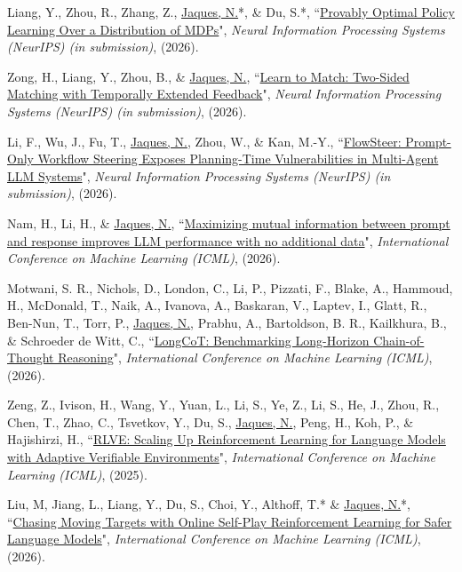\documentclass[paper=letter,fontsize=11pt]{scrartcl} %
\newcommand{\PaperEntry}[6]{
		\noindent #1, ``\href{#6}{#2}", \textit{#3}, #4 (#5).}
\begin{document}
\begin{etaremune}
\item \PaperEntry{Liang, Y., Zhou, R., Zhang, Z., \underline{Jaques, N.}*, \& Du, S.*}{Provably Optimal Policy Learning Over a Distribution of MDPs}{Neural Information Processing Systems (NeurIPS) (in submission)}{}{2026}{}

\item \PaperEntry{Zong, H., Liang, Y., Zhou, B., \& \underline{Jaques, N.}}{Learn to Match: Two-Sided Matching with Temporally Extended Feedback}{Neural Information Processing Systems (NeurIPS) (in submission)}{}{2026}{https://arxiv.org/abs/2606.06744}

\item \PaperEntry{Li, F., Wu, J., Fu, T., \underline{Jaques, N.}, Zhou, W., \& Kan, M.-Y.}{FlowSteer: Prompt-Only Workflow Steering Exposes Planning-Time Vulnerabilities in Multi-Agent LLM Systems}{Neural Information Processing Systems (NeurIPS) (in submission)}{}{2026}{https://arxiv.org/abs/2605.11514}

\item \PaperEntry{Nam, H., Li, H., \& \underline{Jaques, N.}}{Maximizing mutual information between prompt and response improves LLM performance with no additional data}{International Conference on Machine Learning (ICML)}{}{2026}{https://arxiv.org/abs/2603.19294}

\item \PaperEntry{Motwani, S. R., Nichols, D., London, C., Li, P., Pizzati, F., Blake, A., Hammoud, H., McDonald, T., Naik, A., Ivanova, A., Baskaran, V., Laptev, I., Glatt, R., Ben-Nun, T., Torr, P., \underline{Jaques, N.}, Prabhu, A., Bartoldson, B. R., Kailkhura, B., \& Schroeder de Witt, C.}{LongCoT: Benchmarking Long-Horizon Chain-of-Thought Reasoning}{International Conference on Machine Learning (ICML)}{}{2026}{https://arxiv.org/abs/2604.14140}


\item \PaperEntry{Zeng, Z., Ivison, H., Wang, Y., Yuan, L., Li, S., Ye, Z., Li, S., He, J., Zhou, R., Chen, T., Zhao, C., Tsvetkov, Y., Du, S., \underline{Jaques, N.}, Peng, H., Koh, P., \& Hajishirzi, H.}{RLVE: Scaling Up Reinforcement Learning for Language Models with Adaptive Verifiable Environments}{International Conference on Machine Learning (ICML)}{}{2025}{https://arxiv.org/abs/2511.07317}

\item \PaperEntry{Liu, M, Jiang, L., Liang, Y., Du, S., Choi, Y., Althoff, T.* \& \underline{Jaques, N.}*}{Chasing Moving Targets with Online Self-Play Reinforcement Learning for Safer Language Models}{International Conference on Machine Learning (ICML)}{}{2026}{https://arxiv.org/abs/2506.07468}


\end{etaremune}
\end{document}
